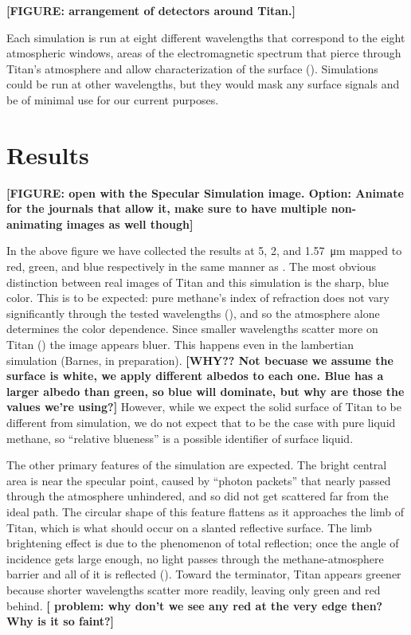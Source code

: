 \documentclass{article}
\begin{document}
\textbf{\color{red} [FIGURE: arrangement of detectors around Titan.] \color{black}}

Each simulation is run at eight different wavelengths that correspond to the eight atmospheric windows, areas of the electromagnetic spectrum that pierce through Titan's atmosphere and allow characterization of the surface (\cite{Barnes2007}). Simulations could be run at other wavelengths, but they would mask any surface signals and be of minimal use for our current purposes. 

\section{Results}
\textbf{\color{red} [FIGURE: open with the Specular Simulation image. Option: Animate for the journals that allow it, make sure to have multiple non-animating images as well though] \color{black}}

In the above figure we have collected the results at 5, 2, and \qty{1.57}{\micro\meter} mapped to red, green, and blue respectively in the same manner as \cite{Barnes2005}. The most obvious distinction between real images of Titan and this simulation is the sharp, blue color. This is to be expected: pure methane's index of refraction does not vary significantly through the tested wavelengths (\cite{Martonchik1994}), and so the atmosphere alone determines the color dependence. Since smaller wavelengths scatter more on Titan (\cite{EsSayeh2023}) the image appears bluer. This happens even in the lambertian simulation (Barnes, in preparation). \textbf{\color{red} [WHY?? Not becuase we assume the surface is white, we apply different albedos to each one. Blue has a larger albedo than green, so blue will dominate, but why are those the values we're using?] \color{black}} However, while we expect the solid surface of Titan to be different from simulation, we do not expect that to be the case with pure liquid methane, so ``relative blueness'' is a possible identifier of surface liquid. 

The other primary features of the simulation are expected. The bright central area is near the specular point, caused by ``photon packets'' that nearly passed through the atmosphere unhindered, and so did not get scattered far from the ideal path. The circular shape of this feature flattens as it approaches the limb of Titan, which is what should occur on a slanted reflective surface. The limb brightening effect is due to the phenomenon of total reflection; once the angle of incidence gets large enough, no light passes through the methane-atmosphere barrier and all of it is reflected (). Toward the terminator, Titan appears greener because shorter wavelengths scatter more readily, leaving only green and red behind. \textbf{\color{red}[ problem: why don't we see any red at the very edge then? Why is it so faint?]\color{black}} 
\end{document}

